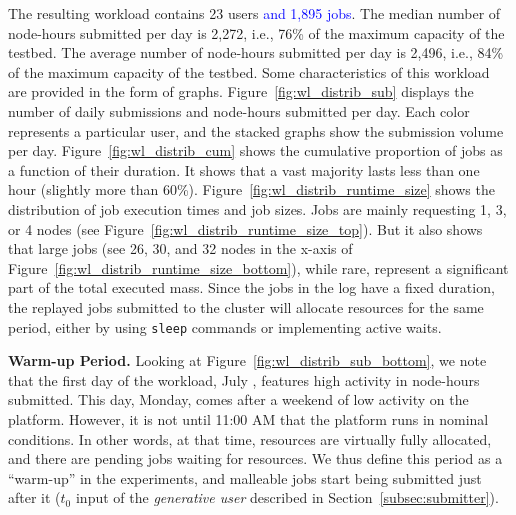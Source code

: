 \documentclass[a4paper,fleqn]{cas-dc}
\newcommand{\review}[1]{\textcolor{blue}{#1}}
\begin{document}
The resulting workload contains 23 users \review{and 1,895 jobs}.
The median number of node-hours submitted per day is 2,272, i.e., 76\%  of the maximum capacity of the testbed.
The average number of node-hours submitted per day is 2,496, i.e., 84\% of the maximum capacity of the testbed.
Some characteristics of this workload are provided in the form of graphs.
Figure~\ref{fig:wl_distrib_sub} displays the number of daily submissions and node-hours submitted per day. 
Each color represents a particular user, and the stacked graphs show the submission volume per day.
Figure~\ref{fig:wl_distrib_cum} shows the cumulative proportion of jobs as a function of their duration. It shows that a vast majority lasts less than one hour (slightly more than 60\%).
Figure~\ref{fig:wl_distrib_runtime_size} shows the distribution of job execution times and job sizes. 
Jobs are mainly requesting 1, 3, or 4 nodes (see Figure~\ref{fig:wl_distrib_runtime_size_top}). 
But it also shows that large jobs (see 26, 30, and 32 nodes in the x-axis of Figure~\ref{fig:wl_distrib_runtime_size_bottom}), while rare, represent a significant part of the total executed mass.
Since the jobs in the log have a fixed duration, the replayed jobs submitted to the cluster will allocate resources for the same period, either by using \texttt{sleep} commands or implementing active waits.

\textbf{Warm-up Period.}
Looking at Figure~\ref{fig:wl_distrib_sub_bottom}, we note that the first day of the workload, July , features high activity in node-hours submitted.
This day, Monday, comes after a weekend of low activity on the platform. 
However, it is not until 11:00 AM that the platform runs in nominal conditions.
In other words, at that time, resources are virtually fully allocated, and there are pending jobs waiting for resources.
We thus define this period as a ``warm-up'' in the experiments, 
and malleable jobs start being submitted just after it ($t_0$ input of the \textit{generative user} described in Section~\ref{subsec:submitter}).
\end{document}
